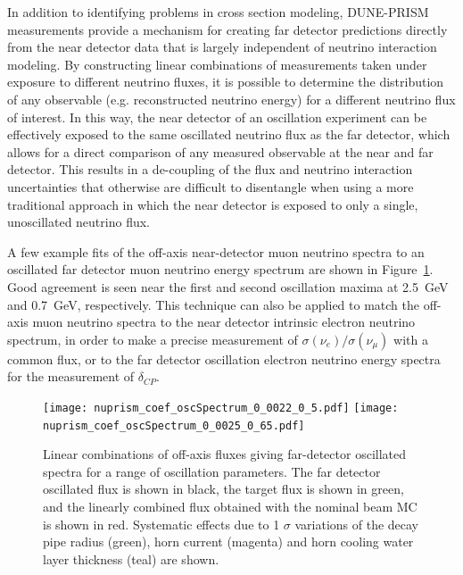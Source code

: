 In addition to identifying problems in cross section modeling, DUNE-PRISM measurements provide a mechanism for creating far detector predictions directly from the near detector data that is largely independent of neutrino interaction modeling. By constructing linear combinations of measurements taken under exposure to different neutrino fluxes, it is possible to determine the distribution of any observable (e.g. reconstructed neutrino energy) for a different neutrino flux of interest. In this way, the near detector of an oscillation experiment can be effectively exposed to the same oscillated neutrino flux as the far detector, which allows for a direct comparison of any measured observable at the near and far detector. This results in a de-coupling of the flux and neutrino interaction uncertainties that otherwise are difficult to disentangle when using a more traditional approach in which the near detector is exposed to only a single, unoscillated neutrino flux.



A few example fits of the off-axis near-detector muon neutrino spectra to an oscillated far detector muon neutrino energy spectrum are shown in Figure~\ref{fig:duneprismfluxfits}. Good agreement is seen near the first and second oscillation maxima at 2.5~GeV and 0.7~GeV, respectively. This technique can also be applied to match the off-axis muon neutrino spectra to the near detector intrinsic electron neutrino spectrum, in order to make a precise measurement of $\sigma(\nu_e)/\sigma(\nu_\mu)$ with a common flux, or to the far detector oscillation electron neutrino energy spectra for the measurement of $\delta_{CP}$.

\begin{figure}
	\centering
	\texttt{[image: nuprism\_coef\_oscSpectrum\_0\_0022\_0\_5.pdf]}
	\texttt{[image: nuprism\_coef\_oscSpectrum\_0\_0025\_0\_65.pdf]}
\caption{Linear combinations of off-axis fluxes giving far-detector oscillated spectra for a range of oscillation parameters. The far detector oscillated flux is shown in black, the target flux is shown in green, and the linearly combined flux obtained with the nominal beam MC is shown in red. Systematic effects due to 1 $\sigma$ variations of the decay pipe radius (green), horn current (magenta) and horn cooling water layer thickness (teal) are shown.}
	\label{fig:duneprismfluxfits}
\end{figure}




